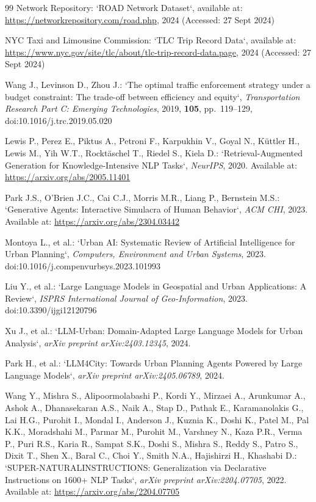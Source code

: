 \documentclass[a4paper,fleqn]{cas-sc}
\begin{document}
\begin{thebibliography}{99}
Network Repository:  
`ROAD Network Dataset`, available at: \url{https://networkrepository.com/road.php}, 2024 (Accessed: 27 Sept 2024)

NYC Taxi and Limousine Commission:  
`TLC Trip Record Data`, available at: \url{https://www.nyc.gov/site/tlc/about/tlc-trip-record-data.page}, 2024 (Accessed: 27 Sept 2024)

Wang J., Levinson D., Zhou J.:  
`The optimal traffic enforcement strategy under a budget constraint: The trade-off between efficiency and equity`, \textit{Transportation Research Part C: Emerging Technologies}, 2019, \textbf{105}, pp.~119--129, doi:10.1016/j.trc.2019.05.020

Lewis P., Perez E., Piktus A., Petroni F., Karpukhin V., Goyal N., Küttler H., Lewis M., Yih W.T., Rocktäschel T., Riedel S., Kiela D.:  
`Retrieval-Augmented Generation for Knowledge-Intensive NLP Tasks`,  
\textit{NeurIPS}, 2020.  
Available at: \url{https://arxiv.org/abs/2005.11401}

Park J.S., O’Brien J.C., Cai C.J., Morris M.R., Liang P., Bernstein M.S.:  
`Generative Agents: Interactive Simulacra of Human Behavior`,  
\textit{ACM CHI}, 2023.  
Available at: \url{https://arxiv.org/abs/2304.03442}

Montoya L., et al.:
`Urban AI: Systematic Review of Artificial Intelligence for Urban Planning`,
\textit{Computers, Environment and Urban Systems},
2023.
doi:10.1016/j.compenvurbsys.2023.101993

Liu Y., et al.:
`Large Language Models in Geospatial and Urban Applications: A Review`,
\textit{ISPRS International Journal of Geo-Information},
2023.
doi:10.3390/ijgi12120796

Xu J., et al.:
`LLM-Urban: Domain-Adapted Large Language Models for Urban Analysis`,
\textit{arXiv preprint arXiv:2403.12345},
2024.

Park H., et al.:
`LLM4City: Towards Urban Planning Agents Powered by Large Language Models`,
\textit{arXiv preprint arXiv:2405.06789},
2024.

Wang Y., Mishra S., Alipoormolabashi P., Kordi Y., Mirzaei A., Arunkumar A., Ashok A., Dhanasekaran A.S., Naik A., Stap D., Pathak E., Karamanolakis G., Lai H.G., Purohit I., Mondal I., Anderson J., Kuznia K., Doshi K., Patel M., Pal K.K., Moradshahi M., Parmar M., Purohit M., Varshney N., Kaza P.R., Verma P., Puri R.S., Karia R., Sampat S.K., Doshi S., Mishra S., Reddy S., Patro S., Dixit T., Shen X., Baral C., Choi Y., Smith N.A., Hajishirzi H., Khashabi D.:  
`SUPER-NATURALINSTRUCTIONS: Generalization via Declarative Instructions on 1600+ NLP Tasks`, \textit{arXiv preprint arXiv:2204.07705}, 2022. Available at: \url{https://arxiv.org/abs/2204.07705}


\end{thebibliography}
\end{document}
